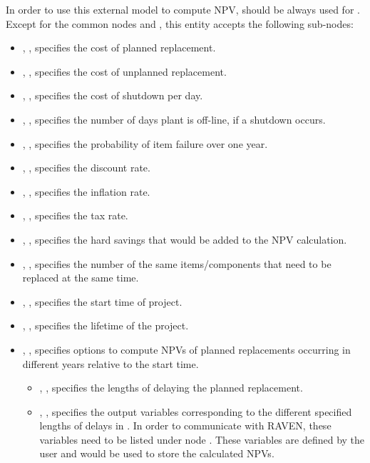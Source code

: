 In order to use this external model to compute NPV, 
should be always used for . Except for the common nodes 
and , this entity accepts the following sub-nodes:
\begin{itemize}
  \item {}, , specifies the cost of planned replacement.
  \item {}, , specifies the cost of unplanned replacement.
  \item {}, , specifies the cost of shutdown per day.
  \item {}, , specifies the number of days
  plant is off-line, if a shutdown occurs.
  \item {}, , specifies the probability
  of item failure over one year.
  \item {}, , specifies the discount rate.
  \item {}, , specifies the inflation rate.
  \item {}, , specifies the tax rate.
  \item {}, , specifies the hard
  savings that would be added to the NPV calculation.
  \item {}, , specifies the number
  of the same items/components that need to be replaced at the same time.
  \item {}, , specifies the
  start time of project.
  \item {}, , specifies the lifetime
  of the project.
  \item {}, , specifies options to compute
  NPVs of planned replacements occurring in different years relative to the start time.
  \begin{itemize}
    \item {}, ,
    specifies the lengths of delaying the planned replacement.
    \item {}, ,
    specifies the output variables corresponding to the different specified lengths of
    delays in . In order to communicate with RAVEN, these
    variables need to be listed under node .
    \nb These variables are defined by the user and would be used to store the
    calculated NPVs.
  \end{itemize}
\end{itemize}

